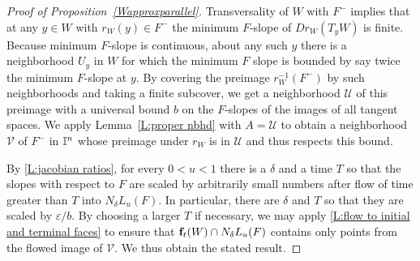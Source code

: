 \begin{proof}[Proof of Proposition~\ref{Wapproxparallel}]
Transversality of $W$ with $F^-$ implies that at any $y \in W$ with $r_W(y) \in F^-$ the minimum $F$-slope
of $Dr_W(T_y W)$ is finite.  Because minimum $F$-slope is continuous,
 about any such $y$ there is a neighborhood $U_y$ in $W$ for which
the minimum $F$ slope is bounded by say twice the minimum $F$-slope at $y$.  By covering the preimage
 $r_W^{-1}(F^-)$ by such neighborhoods and taking a finite subcover,
 we get a neighborhood ${\mathcal U}$ of this preimage
with a universal bound $b$ on the $F$-slopes of the images of
all tangent spaces.  We apply Lemma~\ref{L:proper nbhd} with $A = {\mathcal U}$ to
obtain a neighborhood $\mathcal{V}$ of $F^-$ in $\mathbb{I}^n$ whose preimage under $r_W$ is in ${\mathcal U}$ and thus respects this bound.

\begin{comment}
for any $v \in T_y W$ for some $y$ with $r_W(y) \in F$, the
$F$-decomposition of $D r_W (v)$ will have $(D r_W(v))_F \neq 0$.
Because $D r_W$ and projection onto $\R^F$ are continuous,
there is a $\zeta' > 0$ small enough so that for any $y$ such that
$ r_W(y)$ is in $N_{\zeta'}(F^-)$ and thus in $\overline{N}_{\zeta}(F^-)$ for $\zeta < \zeta'$,
the non-vanishing of $(D r_W(v))_F $  will remain true.

Since $r_W$ is proper, the preimage of  $ \overline N_\zeta(F^-)$ is compact, as is the unit sphere bundle for its tangent bundle for any metric.
So the maximum over unit vectors $v$ in $T_y W$ for $y$ in this preimage
of the set slopes with respect to $F$
 exists; call it $\mu$.
\end{comment}
\begin{comment}
\end{comment}

By  \cref{L:jacobian ratios}, for every $0 < u < 1$ there is a $\delta$ and a time $T$ so that the slopes with respect to $F$ are scaled by arbitrarily small numbers after flow of time greater than $T$ into $N_\delta L_u(F)$.
In particular, there are $\delta$ and  $T$ so that they are scaled by $\varepsilon/ b$.
By choosing a larger $T$ if necessary, we may apply \cref{L:flow to initial and terminal faces} to ensure that $\mathbf{f}_t(W) \cap N_\delta L_u(F)$ contains only points from the flowed image of ${\mathcal{V}}$.
We thus obtain the stated result.
\end{proof}
